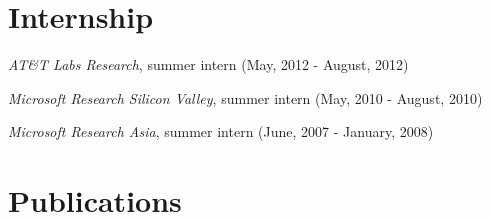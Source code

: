 \documentclass[letterpaper]{article}
\renewenvironment{itemize}{
  \begin{list}{}{
    \setlength{\leftmargin}{1em}
  }
}{
  \end{list}
}
\begin{document}

\section*{Internship}
\begin{itemize}
\item {\em AT\&T Labs Research}, summer intern (May, 2012 - August, 2012)
\item {\em Microsoft Research Silicon Valley}, summer intern (May, 2010 - August, 2010)
\item {\em Microsoft Research Asia}, summer intern (June, 2007 - January, 2008)
\end{itemize}

\section*{Publications}
\end{document}

